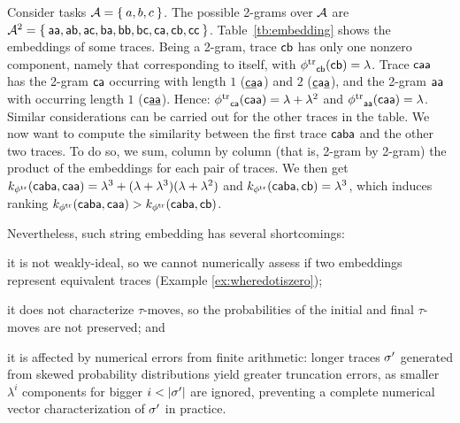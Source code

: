 \begin{example}\label{ex:wheredotiszero} %
	Consider tasks $\mathcal{A}=\Set{a,b,c}$. The possible 2-grams over $\mathcal{A}$ are $\mathcal{A}^2=\Set{\mathsf{aa},\mathsf{ab},\mathsf{ac},\mathsf{ba},\mathsf{bb},\mathsf{bc},\mathsf{ca},\mathsf{cb},\mathsf{cc}}$. Table~\ref{tb:embedding} shows the embeddings of some traces. Being a 2-gram, trace $\mathsf{cb}$ has only one nonzero component, namely that corresponding to itself, with ${\phi^{\text{tr}}}_{\mathsf{cb}}(\mathsf{cb})=\lambda$. Trace $\mathsf{caa}$ has the 2-gram $\mathsf{ca}$ occurring with length $1$ ($\mathsf{\underline{ca}a}$) and $2$ ($\mathsf{\underline{c}a\underline{a}}$), and the 2-gram $\mathsf{aa}$ with occurring length $1$ ($\mathsf{c\underline{aa}}$). Hence: ${\phi^{\text{tr}}}_{\mathsf{ca}}(\mathsf{caa})=\lambda+\lambda^2$ and  ${\phi^{\text{tr}}}_{\mathsf{aa}}(\mathsf{caa})=\lambda$.  Similar considerations can be carried out for the other traces in the table.
	We now want to compute the similarity between the first trace $\mathsf{caba}$ and the other two traces. To do so, we sum, column by column (that is, 2-gram by 2-gram) the product of the embeddings for each pair of traces. We then get $k_{{\phi^{\text{tr}}}}(\mathsf{caba},\mathsf{caa})=\lambda^3+(\lambda+\lambda^3)(\lambda+\lambda^2)$ and $k_{{\phi^{\text{tr}}}}(\mathsf{caba},\mathsf{cb})=\lambda^3
	$,
	which induces ranking $
	k_{{\phi^{\text{tr}}}}(\mathsf{caba},\mathsf{caa})>
	k_{{\phi^{\text{tr}}}}(\mathsf{caba},\mathsf{cb})
	$.
\end{example}

Nevertheless, such string embedding has several shortcomings: \begin{alphalist}
	\item it is not weakly-ideal, so we cannot numerically assess if two embeddings represent equivalent traces
	(Example \ref{ex:wheredotiszero});
	\item it does not characterize $\tau$-moves, so the probabilities of the initial and final $\tau$-moves are not preserved; and
	\item it is affected by numerical errors from finite arithmetic: longer traces ${\sigma'}$ generated from skewed probability
	distributions %
	yield greater truncation errors, as smaller $\lambda^i$ components for bigger
	$i<|\nonlogtrace|$ are ignored, preventing a complete numerical vector characterization of  ${\sigma'}$ in practice.
\end{alphalist}

\endinput




